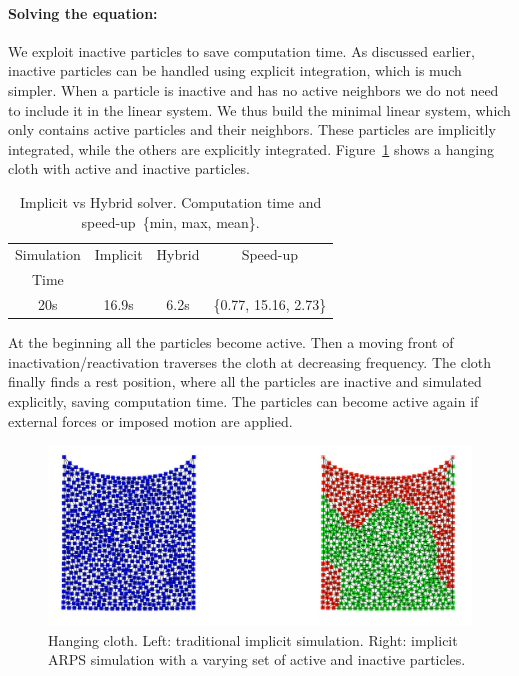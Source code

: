 \paragraph*{Solving the equation:}
We exploit inactive particles to save computation time.
As discussed earlier, inactive particles can be handled using explicit integration, which is much simpler.
When a particle is inactive and has no active neighbors we do not need to include it in the linear system.
We thus build the minimal linear system, which only contains active particles and their neighbors.
These particles are implicitly integrated, while the others are explicitly integrated.
Figure~\ref{fig:clothARPS} shows a hanging cloth with active and inactive particles.

\begin{table}[htb]
    \centering
\begin{tabular}{|c|c|c|c|} \hline
    Simulation & Implicit  & Hybrid    & Speed-up \\
    Time & & & \\ \hline
    20s             & 16.9s     & 6.2s      &  \{0.77, 15.16, 2.73\}\\ \hline
\end{tabular}
\caption[ARPS: Implicit vs. Hybrid solver - Measurements]{\label{tab:clothePerf}Implicit vs Hybrid solver. Computation time and speed-up~\small{\{min, max, mean\}.}}
\end{table}

At the beginning all the particles become active. Then a moving front of inactivation/reactivation traverses the cloth at decreasing frequency. The cloth finally finds a rest position, where all the particles are inactive and simulated explicitly, saving computation time. The particles can become active again if external forces or imposed motion are applied.

\begin{figure}[ht!]
  \centering
  \includegraphics[width=0.8\linewidth]{images/arps-vriphys2013/Square3.jpg}
  \caption[ARPS: ARPS cloth simulation]{\label{fig:clothARPS} Hanging cloth. Left: traditional implicit simulation. Right: implicit ARPS simulation with a varying set of active and inactive particles. }
\end{figure}

